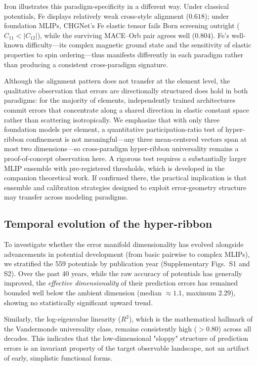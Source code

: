 \documentclass[twocolumn,9pt]{extarticle}
\begin{document}
Iron illustrates this paradigm-specificity in a different way. Under classical potentials, Fe displays relatively weak cross-style alignment ($0.618$); under foundation MLIPs, CHGNet's Fe elastic tensor fails Born screening outright ($C_{11}<|C_{12}|$), while the surviving MACE--Orb pair agrees well ($0.804$). Fe's well-known difficulty---its complex magnetic ground state and the sensitivity of elastic properties to spin ordering---thus manifests differently in each paradigm rather than producing a consistent cross-paradigm signature.

Although the alignment pattern does not transfer at the element level, the qualitative observation that errors are directionally structured does hold in both paradigms: for the majority of elements, independently trained architectures commit errors that concentrate along a shared direction in elastic constant space rather than scattering isotropically. We emphasize that with only three foundation models per element, a quantitative participation-ratio test of hyper-ribbon confinement is not meaningful---any three mean-centered vectors span at most two dimensions---so cross-paradigm hyper-ribbon universality remains a proof-of-concept observation here. A rigorous test requires a substantially larger MLIP ensemble with pre-registered thresholds, which is developed in the companion theoretical work\cite{welcing2026universality}. If confirmed there, the practical implication is that ensemble and calibration strategies designed to exploit error-geometry structure may transfer across modeling paradigms.

\subsection{Temporal evolution of the hyper-ribbon}

To investigate whether the error manifold dimensionality has evolved alongside advancements in potential development (from basic pairwise to complex MLIPs), we stratified the 559 potentials by publication year (Supplementary Figs.~S1 and S2). Over the past 40 years, while the raw accuracy of potentials has generally improved, the \textit{effective dimensionality} of their prediction errors has remained bounded well below the ambient dimension (median $\approx 1.1$, maximum $2.29$), showing no statistically significant upward trend.

Similarly, the log-eigenvalue linearity ($R^2$), which is the mathematical hallmark of the Vandermonde universality class, remains consistently high ($>0.80$) across all decades. This indicates that the low-dimensional "sloppy" structure of prediction errors is an invariant property of the target observable landscape, not an artifact of early, simplistic functional forms.
\end{document}
